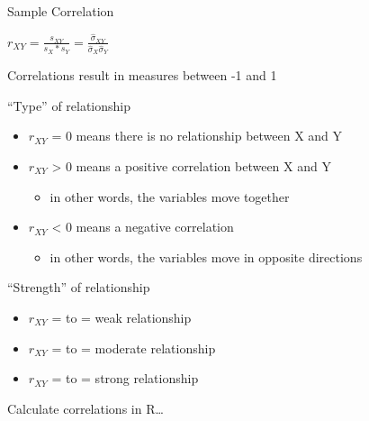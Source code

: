 \documentclass[
  8pt,
  ignorenonframetext,
  dvipsnames]{beamer}
\providecommand{\tightlist}{%
  \setlength{\itemsep}{0pt}\setlength{\parskip}{0pt}}
\let\olditem\item
\renewcommand{\item}{%
  \olditem\vspace{4pt}
}
\begin{document}
\begin{frame}{Sample Correlation}
\protect\hypertarget{sample-correlation}{}

\(r_{XY}=\frac{s_{XY}}{s_X*s_Y} = \frac{\hat{\sigma}_{XY}}{\hat{\sigma}_X \hat{\sigma}_Y}\)

\medskip

Correlations result in measures between -1 and 1

\medskip

``Type'' of relationship

\begin{itemize}
\tightlist
\item
  \(r_{XY}\) = 0 means there is no relationship between X and Y
\item
  \(r_{XY}\) \textgreater{} 0 means a positive correlation between X and
  Y

  \begin{itemize}
  \tightlist
  \item
    in other words, the variables move together
  \end{itemize}
\item
  \(r_{XY}\) \textless{} 0 means a negative correlation

  \begin{itemize}
  \tightlist
  \item
    in other words, the variables move in opposite directions
  \end{itemize}
\end{itemize}

\medskip

``Strength'' of relationship

\begin{itemize}
\tightlist
\item
  \(r_{XY}\) = \textbar{} to \textbar{} = weak
  relationship
\item
  \(r_{XY}\) = \textbar{} to \textbar{} = moderate
  relationship
\item
  \(r_{XY}\) = \textbar{} to \textbar{} = strong
  relationship
\end{itemize}

\medskip

Calculate correlations in R\ldots{}

\end{frame}
\end{document}
